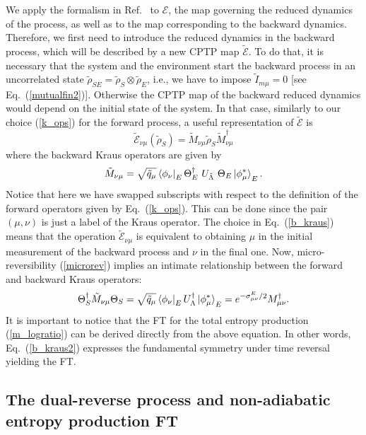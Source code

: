 \documentclass[aps,prx,twocolumn,showpacs,floatfix,superscriptaddress,graphics,longbibliography]{revtex4-1}
\newcommand{\E}{{\mathcal E}}
\newcommand{\HAT}{}
\begin{document}
We apply the formalism in Ref.~\cite{MHP} to $\E$, the map governing the reduced dynamics of the process, as well as to the map corresponding to the backward dynamics.  Therefore, we first need to introduce the reduced dynamics in the backward process, which will be described by a new CPTP map $\tilde\E$. To do that, it is necessary that the system and the environment start the backward process in an uncorrelated state $\tilde\rho_{SE}=\tilde \rho_{S}\otimes \tilde\rho_E$, i.e., we have to impose $\tilde I_{m\mu}=0$ [see Eq.~(\ref{mutualfin2})]. Otherwise the CPTP map of the backward reduced dynamics would depend on the initial state of the system.
In that case, similarly to our choice (\ref{k_ops}) for the forward process, a useful representation of $\tilde \E$ is
\begin{equation}\label{b_ops}
\tilde{\E}_{\nu \mu}(\tilde{\rho}_S) = \HAT{\tilde{M}}_{\nu \mu} \tilde{\rho}_S \HAT{\tilde{M}}_{\nu \mu}^\dagger  
\end{equation}
where the  backward Kraus operators are given by
\begin{equation}\label{b_kraus}
 \HAT{\tilde{M}}_{\nu \mu} = \sqrt{\tilde{q}_\mu} \bra{\phi_\nu}_{E} \HAT\Theta_E^\dagger ~\HAT{U}_{\tilde{\Lambda}}~ \HAT\Theta_E \ket{\phi_\mu^\ast}_{E}. 
\end{equation}
Notice that here we have swapped subscripts with respect to the definition of the forward operators given by Eq.~(\ref{k_ops}). 
This can be done since the pair $(\mu,\nu)$ is just a label of the Kraus operator. The choice in Eq.~(\ref{b_kraus}) means that the operation $\tilde{\E}_{\nu \mu}$ is equivalent to obtaining $\mu$ in the initial measurement of the backward process and $\nu$ in the final one.
Now, micro-reversibility (\ref{microrev})  implies an intimate relationship between the forward and backward Kraus operators:
\begin{equation}\label{b_kraus2}
\HAT\Theta_S^\dagger \HAT{\tilde{M}}_{\nu \mu} \HAT\Theta_S= \sqrt{{\tilde{q}_\mu}} \bra{\phi_\nu}_{E} \HAT{U}^\dagger_{{\Lambda}}\ket{\phi_\mu^\ast}_{E}=e^{-\sigma^E_{\mu\nu}/2}\HAT M^\dagger_{\mu\nu}. 
\end{equation}
It is important to notice that the FT for the total entropy production (\ref{m_logratio}) can be derived directly from the above equation. 
In other words, Eq.~(\ref{b_kraus2}) expresses the fundamental symmetry under time reversal yielding  the FT.

\subsection{The dual-reverse process and non-adiabatic entropy production FT}
\end{document}
